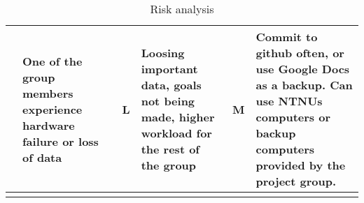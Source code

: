 \begin{landscape}
\begin{longtable}{| p{0.4cm} | p{4cm} | p{4cm} | p{2cm} | p{4cm} | p{1cm} | p{4cm} |}
	\stepcounter{riskId}
	\centering
		\arabic{riskId} &
        One of the group members experience hardware failure or loss of data &
		& \centering L &
		Loosing important data, goals not being made, higher workload for the rest of the group &
		\centering M &
		Commit to github often, or use Google Docs as a backup. Can use NTNUs computers or backup computers provided by the project group. \\
	\hline
\caption{Risk analysis}
\end{longtable}

\end{landscape}
